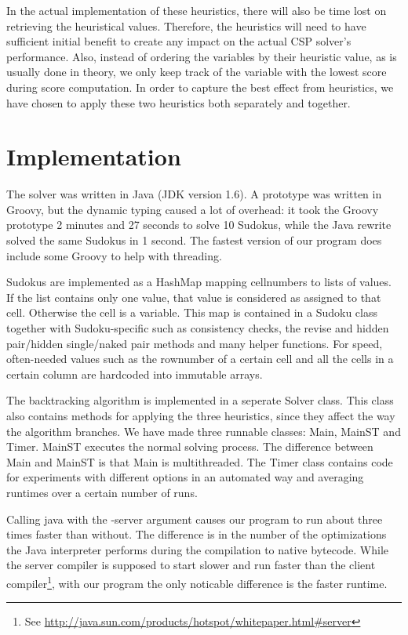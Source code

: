 \documentclass[11pt]{article} %
\begin{document}
In the actual implementation of these heuristics, there will also be time lost on retrieving the heuristical values. Therefore, the heuristics will need to have sufficient initial benefit to create any impact on the actual CSP solver's performance. Also, instead of ordering the variables by their heuristic value, as is usually done in theory, we only keep track of the variable with the lowest score during score computation. In order to capture the best effect from heuristics, we have chosen to apply these two heuristics both separately and together.

\section{Implementation}

The solver was written in Java (JDK version 1.6). A prototype was written in Groovy, but the dynamic typing caused a lot of overhead: it took the Groovy prototype 2 minutes and 27 seconds to solve 10 Sudokus, while the Java rewrite solved the same Sudokus in 1 second. The fastest version of our program does include some Groovy to help with threading.

Sudokus are implemented as a HashMap mapping cellnumbers to lists of values. If the list contains only one value, that value is considered as assigned to that cell. Otherwise the cell is a variable. This map is contained in a Sudoku class together with Sudoku-specific such as consistency checks, the revise and hidden pair/hidden single/naked pair methods and many helper functions. For speed, often-needed values such as the rownumber of a certain cell and all the cells in a certain column are hardcoded into immutable arrays.

The backtracking algorithm is implemented in a seperate Solver class. This class also contains methods for applying the three heuristics, since they affect the way the algorithm branches.
We have made three runnable classes: Main, MainST and Timer. MainST executes the normal solving process. The difference between Main and MainST is that Main is multithreaded. The Timer class contains code for experiments with different options in an automated way and averaging runtimes over a certain number of runs.

Calling java with the -server argument causes our program to run about three times faster than without. The difference is in the number of the optimizations the Java interpreter performs during the compilation to native bytecode. While the server compiler is supposed to start slower and run faster than the client compiler\footnote{See \url{http://java.sun.com/products/hotspot/whitepaper.html\#server}}, with our program the only noticable difference is the faster runtime.
\end{document}
